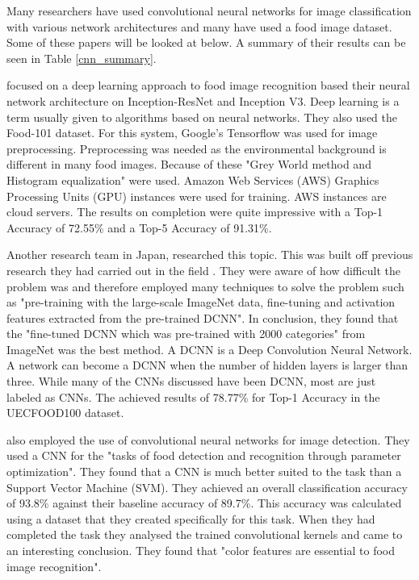 Many researchers have used convolutional neural networks for image
classification with various network architectures and many have used a food image dataset.
Some of these papers will be looked at below.
A summary of their results can be seen in Table \ref{cnn_summary}.

\parencite{deepLearning} focused on a deep learning approach to food image recognition based
their neural network architecture on Inception-ResNet and Inception V3.
Deep learning is a term usually given to algorithms based on neural networks.
They also used the Food-101 dataset. For this system, Google's
Tensorflow was used for image preprocessing. Preprocessing was needed as the
environmental background is different in many food images. Because of these
"Grey World method and Histogram equalization" \parencite{deepLearning} were
used.
Amazon Web Services (AWS) Graphics Processing Units (GPU) instances were used for training.
AWS instances are cloud servers.
The results on completion were quite impressive with a Top-1 Accuracy of 72.55\% and a Top-5 Accuracy of 91.31\%.

Another research team in Japan, \parencite{yanaiFood} researched this topic. This was built off previous research they had carried out in the field \parencite{kawano2014food}.
They were aware of how
difficult the problem was and therefore employed many techniques to solve the
problem such as "pre-training with the large-scale ImageNet data, fine-tuning
and activation features extracted from the pre-trained DCNN". 
In conclusion, they found that the "fine-tuned DCNN which was pre-trained
with 2000 categories" from ImageNet was the best method. A
DCNN is a Deep Convolution Neural Network. 
A network can become a DCNN when the number of hidden layers is larger than three.
While many of the CNNs discussed have been DCNN, most are just labeled as CNNs.
The achieved results of 78.77\% for Top-1 Accuracy in the UECFOOD100 dataset.


\parencite{kagayaFood} also employed the use of convolutional neural networks for
image detection. They used a CNN for the "tasks of food detection and recognition
through parameter optimization".
They found that a CNN is much better suited to the task than a Support Vector
Machine (SVM). They achieved an overall classification accuracy of 93.8\%
against their baseline accuracy of 89.7\%. This accuracy
was calculated using a dataset that they created specifically for this task.
When they had completed the task they analysed the trained convolutional kernels
and came to an interesting conclusion. They found that "color features are
essential to food image recognition".


